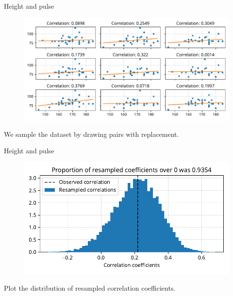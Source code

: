 \documentclass[12pt, aspectratio=149]{beamer}
\theoremstyle{plain}
\begin{document}
\begin{frame}[fragile]{Height and pulse}
\begin{center}
 \begin{figure}
    	\centering
    	\includegraphics[width=0.99\linewidth]{figures/height_pulse_resamples.pdf}
 \end{figure}
 We sample the dataset by drawing pairs with replacement.
 \end{center}
\end{frame}


\begin{frame}[fragile]{Height and pulse}
\begin{center}
 \begin{figure}
    	\centering
    	\includegraphics[width=0.99\linewidth]{figures/height_pulse_coefs_binned.pdf}
 \end{figure}
 Plot the distribution of resampled correlation coefficients.
 \end{center}
\end{frame}
\end{document}
